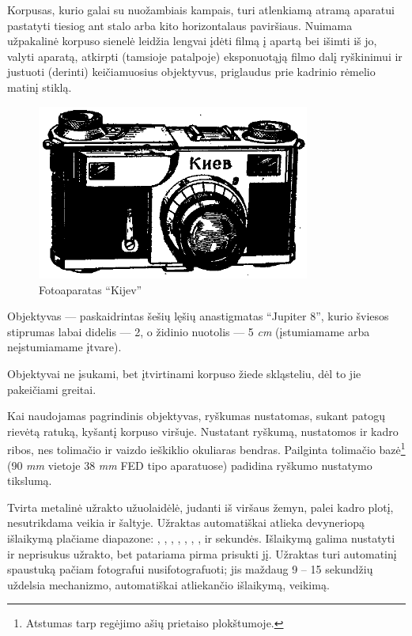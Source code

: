\documentclass[12pt]{book}
\begin{document}
			Korpusas, kurio galai su nuožambiais kampais, turi atlenkiamą atramą aparatui pastatyti tiesiog ant stalo arba kito horizontalaus paviršiaus. Nuimama užpakalinė korpuso sienelė leidžia lengvai įdėti filmą į apartą bei išimti iš jo, valyti aparatą, atkirpti (tamsioje patalpoje) eksponuotąją filmo dalį ryškinimui ir justuoti (derinti) keičiamuosius objektyvus, priglaudus prie kadrinio rėmelio matinį stiklą.
			\begin{figure}[h]
				\centering
				\includegraphics[width=0.8\textwidth]{22-pav}
				\caption{Fotoaparatas ``Kijev''}
				\label{fig:22}
			\end{figure}

			Objektyvas --- paskaidrintas šešių lęšių anastigmatas ``Jupiter 8'', kurio šviesos stiprumas labai didelis --- 2, o židinio nuotolis --- 5 \textit{cm} (įstumiamame arba neįstumiamame įtvare).

			Objektyvai ne įsukami, bet įtvirtinami korpuso žiede skląsteliu, dėl to jie pakeičiami greitai.

			Kai naudojamas pagrindinis objektyvas, ryškumas nustatomas, sukant patogų rievėtą ratuką, kyšantį korpuso viršuje. Nustatant ryškumą, nustatomos ir kadro ribos, nes tolimačio ir vaizdo ieškiklio okuliaras bendras. Pailginta tolimačio bazė\footnote{Atstumas tarp regėjimo ašių prietaiso plokštumoje.} (90 \textit{mm} vietoje 38 \textit{mm} FED tipo aparatuose) padidina ryškumo nustatymo tikslumą.

			Tvirta metalinė užrakto užuolaidėlė, judanti iš viršaus žemyn, palei kadro plotį, nesutrikdama veikia ir šaltyje. Užraktas automatiškai atlieka devyneriopą išlaikymą plačiame diapazone: , , , , , , ,  ir  sekundės. Išlaikymą galima nustatyti ir neprisukus užrakto, bet patariama pirma prisukti jį. Užraktas turi automatinį spaustuką pačiam fotografui nusifotografuoti; jis maždaug 9 -- 15 sekundžių uždelsia mechanizmo, automatiškai atliekančio išlaikymą, veikimą.
\end{document}
